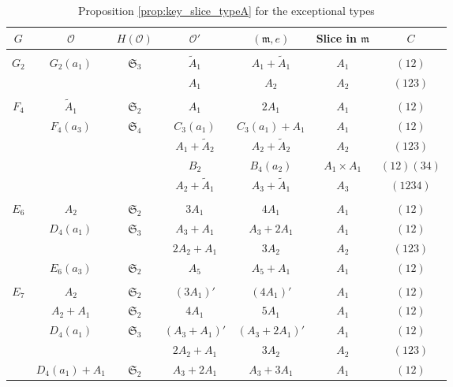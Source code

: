 \documentclass{amsart}
\theoremstyle{definition}
\newcommand{\frakm}{\mathfrak{m}}
\newcommand{\frakS}{\mathfrak{S}}
\newcommand{\0}{\mathcal{O}}
\begin{document}
\begin{table}%
		\caption{Proposition \ref{prop:key_slice_typeA} for the exceptional types}\label{table:attaching_conj_classes}
		\begin{center}
			\begin{tabular}{|c | c| c|c |c| c| c|}
				\hline
				$G$ & $\0$ & $H(\0)$ & $\0'$ & $(\frakm,e)$ &  Slice in $\frakm$ & $C$ \\
                \hline & & & &  & & \\[-0.3cm]
                $G_2$ & $G_2(a_1)$ & $\frakS_3$ & $\tilde{A}_1$ & $A_1 + \tilde{A}_1$ & $A_1$ & $(12)$ \\
                      &   &   & $A_1$ & $A_2$ & $A_2$  & $(123)$ \\
				\hline & & & &  & & \\[-0.3cm]
				$F_4$ & $\tilde{A}_1$ & $\frakS_2$ & $A_1$ & $2A_1$ &  $A_1$ & $(12)$\\
                        & $F_4(a_3)$ & $\frakS_4$ & $C_3(a_1)$ & $C_3(a_1)+A_1$ & $A_1$ & $(12)$\\
                        &  & & $A_1 + \tilde{A}_2$ & $A_2 + \tilde{A}_2$ & $A_2$ & $(123)$ \\
				         &  & & $B_2$ & $B_4(a_2)$ & $A_1\times A_1$ & $(12)(34)$ \\
                         &  & & $A_2 + \tilde{A}_1$ & $A_3 + \tilde{A}_1$ & $A_3$ & $(1234)$ \\

				\hline & & & &  & & \\[-0.3cm]
				$E_6$ & $A_2$ & $\frakS_2$ & $3A_1$ & $4A_1$ &  $A_1$ & $(12)$\\
                      & $D_4(a_1)$ & $\frakS_3$ & $A_3+A_1$ & $A_3+2A_1$ &  $A_1$ & $(12)$\\  
                      & & & $2A_2+A_1$ & $3A_2$ &  $A_2$ & $(123)$\\  
                    & $E_6(a_3)$ & $\frakS_2$ & $A_5$ &  $A_5+A_1$ &  $A_1$ & $(12)$\\
                
				\hline & & & & & &  \\[-0.3cm]
				$E_7$ & $A_2$ & $\frakS_2$ & $(3A_1)'$ & $(4A_1)'$ &  $A_1$ & $(12)$\\
                    &  $A_2+A_1$ & $\frakS_2$ &  $4A_1$ & $5A_1$ & $A_1$ & $(12)$\\
                     & $D_4(a_1)$ & $\frakS_3$ & $(A_3+A_1)'$ & $(A_3+2A_1)'$ &  $A_1$ & $(12)$\\  
                      & & & $2A_2+A_1$ & $3A_2$ &  $A_2$ & $(123)$\\  
				    & $D_4(a_1)+A_1$ & $\frakS_2$ & $A_3+2A_1$ & $A_3+3A_1$ &  $A_1$ & $(12)$\\  
								 

\end{tabular}
\end{center}
\end{table}
\end{document}
